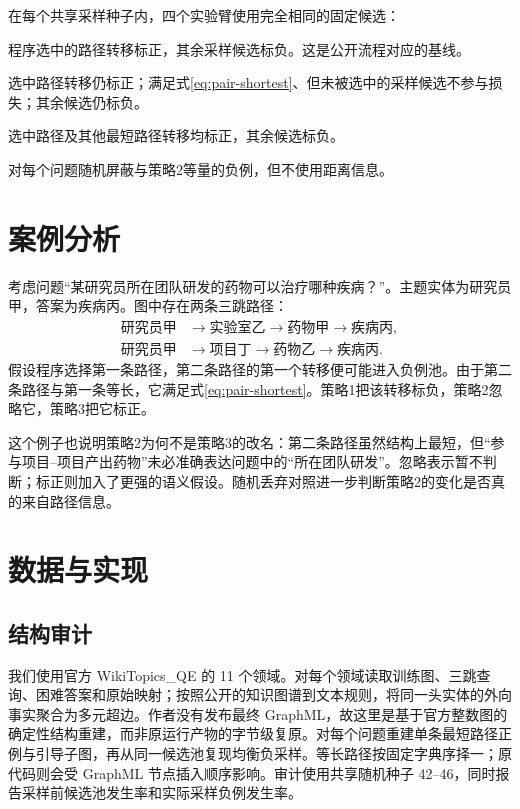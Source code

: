 \documentclass[UTF8,11pt]{ctexart}
\begin{document}
在每个共享采样种子内，四个实验臂使用完全相同的固定候选：
\begin{description}[leftmargin=3.5em,style=nextline]
  \item[策略1] 程序选中的路径转移标正，其余采样候选标负。这是公开流程对应的基线。
  \item[策略2] 选中路径转移仍标正；满足式\eqref{eq:pair-shortest}、但未被选中的采样候选不参与损失；其余候选仍标负。
  \item[策略3] 选中路径及其他最短路径转移均标正，其余候选标负。
  \item[随机丢弃] 对每个问题随机屏蔽与策略2等量的负例，但不使用距离信息。
\end{description}

\section{案例分析}

考虑问题“某研究员所在团队研发的药物可以治疗哪种疾病？”。主题实体为研究员甲，答案为疾病丙。图中存在两条三跳路径：
\begin{align*}
 \text{研究员甲}&\rightarrow\text{实验室乙}
 \rightarrow\text{药物甲}\rightarrow\text{疾病丙},\\
 \text{研究员甲}&\rightarrow\text{项目丁}
 \rightarrow\text{药物乙}\rightarrow\text{疾病丙}.
\end{align*}
假设程序选择第一条路径，第二条路径的第一个转移便可能进入负例池。由于第二条路径与第一条等长，它满足式\eqref{eq:pair-shortest}。策略1把该转移标负，策略2忽略它，策略3把它标正。

这个例子也说明策略2为何不是策略3的改名：第二条路径虽然结构上最短，但“参与项目--项目产出药物”未必准确表达问题中的“所在团队研发”。忽略表示暂不判断；标正则加入了更强的语义假设。随机丢弃对照进一步判断策略2的变化是否真的来自路径信息。

\section{数据与实现}

\subsection{结构审计}

我们使用官方 WikiTopics\_QE 的 11 个领域。对每个领域读取训练图、三跳查询、困难答案和原始映射；按照公开的知识图谱到文本规则，将同一头实体的外向事实聚合为多元超边。作者没有发布最终 GraphML，故这里是基于官方整数图的确定性结构重建，而非原运行产物的字节级复原。对每个问题重建单条最短路径正例与引导子图，再从同一候选池复现均衡负采样。等长路径按固定字典序择一；原代码则会受 GraphML 节点插入顺序影响。审计使用共享随机种子 42--46，同时报告采样前候选池发生率和实际采样负例发生率。
\end{document}
